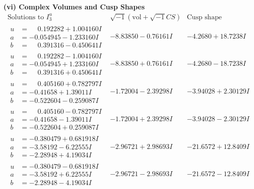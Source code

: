 \documentclass[1p]{elsarticle_modified}
\theoremstyle{definition}
\newcommand{\I}{\sqrt{-1}}
\begin{document}
\newpage\flushleft \textbf{(vi) Complex Volumes and Cusp Shapes}
$$\begin{array}{c|c|c}  
\text{Solutions to }I^u_{3}& \I (\text{vol} + \sqrt{-1}CS) & \text{Cusp shape}\\
 \hline 
\begin{aligned}
u &= \phantom{-}0.192282 + 1.004160 I \\
a &= -0.054945 - 1.233160 I \\
b &= \phantom{-}0.391316 - 0.450641 I\end{aligned}
 & -8.83850 - 0.76161 I & -4.2680 + 18.7238 I \\ \hline\begin{aligned}
u &= \phantom{-}0.192282 - 1.004160 I \\
a &= -0.054945 + 1.233160 I \\
b &= \phantom{-}0.391316 + 0.450641 I\end{aligned}
 & -8.83850 + 0.76161 I & -4.2680 - 18.7238 I \\ \hline\begin{aligned}
u &= \phantom{-}0.405160 + 0.782797 I \\
a &= -0.41658 + 1.39011 I \\
b &= -0.522604 - 0.259087 I\end{aligned}
 & -1.72004 - 2.39298 I & -3.94028 + 2.30129 I \\ \hline\begin{aligned}
u &= \phantom{-}0.405160 - 0.782797 I \\
a &= -0.41658 - 1.39011 I \\
b &= -0.522604 + 0.259087 I\end{aligned}
 & -1.72004 + 2.39298 I & -3.94028 - 2.30129 I \\ \hline\begin{aligned}
u &= -0.380479 + 0.681918 I \\
a &= -3.58192 - 6.22555 I \\
b &= -2.28948 + 4.19034 I\end{aligned}
 & -2.96721 + 2.98693 I & -21.6572 + 12.8409 I \\ \hline\begin{aligned}
u &= -0.380479 - 0.681918 I \\
a &= -3.58192 + 6.22555 I \\
b &= -2.28948 - 4.19034 I\end{aligned}
 & -2.96721 - 2.98693 I & -21.6572 - 12.8409 I \\ \hline\begin{aligned}

\end{aligned}
\end{array}$$
\end{document}
